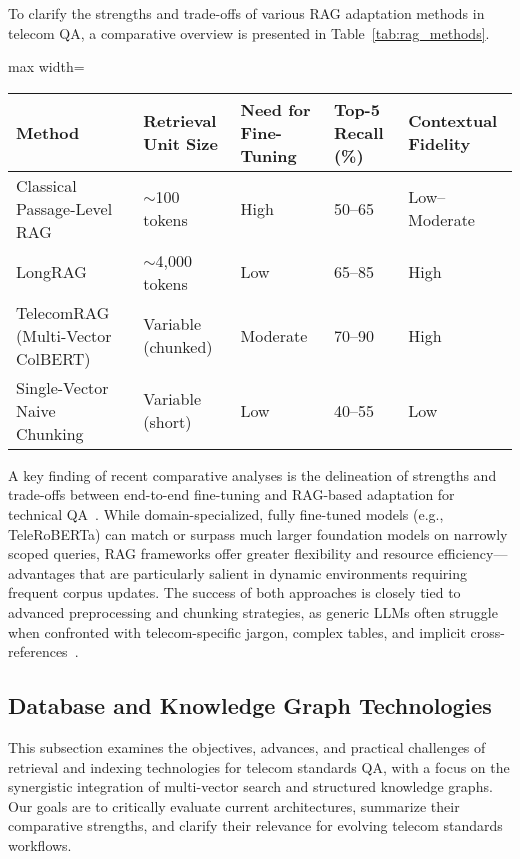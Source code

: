\documentclass[sigconf]{acmart}
\begin{document}
To clarify the strengths and trade-offs of various RAG adaptation methods in telecom QA, a comparative overview is presented in Table~\ref{tab:rag_methods}.

\begin{table*}[htbp]
\centering
\caption{Comparative Properties of RAG Adaptation Strategies in Telecom Question Answering}
\label{tab:rag_methods}
\begin{adjustbox}{max width=\textwidth}
\begin{tabular}{lllll}
\toprule
\textbf{Method} & \textbf{Retrieval Unit Size} & \textbf{Need for Fine-Tuning} & \textbf{Top-5 Recall (\%)} & \textbf{Contextual Fidelity} \\
\midrule
Classical Passage-Level RAG & \(\sim\)100 tokens & High & 50--65 & Low--Moderate \\
LongRAG & \(\sim\)4,000 tokens & Low & 65--85 & High \\
TelecomRAG (Multi-Vector ColBERT) & Variable (chunked) & Moderate & 70--90 & High \\
Single-Vector Naive Chunking & Variable (short) & Low & 40--55 & Low \\
\bottomrule
\end{tabular}
\end{adjustbox}
\end{table*}

A key finding of recent comparative analyses is the delineation of strengths and trade-offs between end-to-end fine-tuning and RAG-based adaptation for technical QA~\cite{ref22,ref26}. While domain-specialized, fully fine-tuned models (e.g., TeleRoBERTa) can match or surpass much larger foundation models on narrowly scoped queries, RAG frameworks offer greater flexibility and resource efficiency---advantages that are particularly salient in dynamic environments requiring frequent corpus updates. The success of both approaches is closely tied to advanced preprocessing and chunking strategies, as generic LLMs often struggle when confronted with telecom-specific jargon, complex tables, and implicit cross-references~\cite{ref22}.

\subsection{Database and Knowledge Graph Technologies}

This subsection examines the objectives, advances, and practical challenges of retrieval and indexing technologies for telecom standards QA, with a focus on the synergistic integration of multi-vector search and structured knowledge graphs. Our goals are to critically evaluate current architectures, summarize their comparative strengths, and clarify their relevance for evolving telecom standards workflows.
\end{document}
